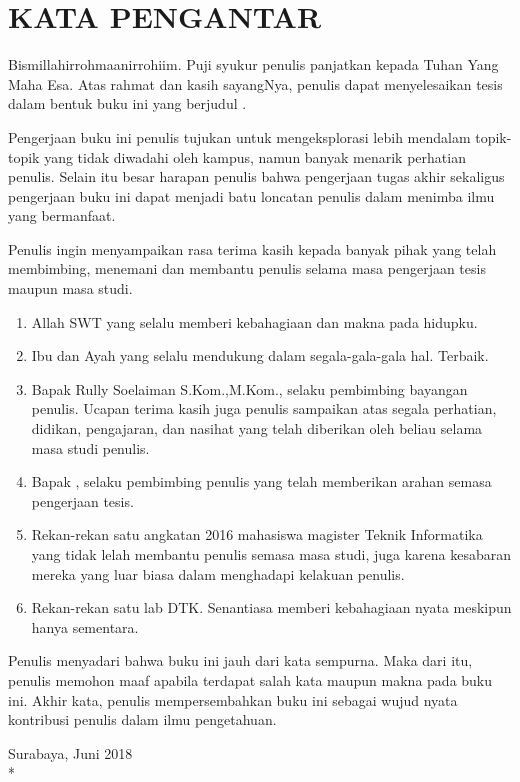 \chapter {KATA PENGANTAR}

Bismillahirrohmaanirrohiim. Puji syukur penulis panjatkan kepada Tuhan Yang Maha Esa. Atas rahmat dan kasih sayangNya, penulis dapat menyelesaikan tesis dalam bentuk buku ini yang berjudul \textbf{\judul}.

Pengerjaan buku ini penulis tujukan untuk mengeksplorasi lebih mendalam topik-topik yang tidak diwadahi oleh kampus, namun banyak menarik perhatian penulis. Selain itu besar harapan penulis bahwa pengerjaan tugas akhir sekaligus pengerjaan buku ini dapat menjadi batu loncatan penulis dalam menimba ilmu yang bermanfaat.

Penulis ingin menyampaikan rasa terima kasih kepada banyak pihak yang telah membimbing, menemani dan membantu penulis selama masa pengerjaan tesis maupun masa studi.

\begin {enumerate}
	\item Allah SWT yang selalu memberi kebahagiaan dan makna pada hidupku.
  \item Ibu dan Ayah yang selalu mendukung dalam segala-gala-gala hal. Terbaik.
  \item Bapak Rully Soelaiman S.Kom.,M.Kom., selaku pembimbing bayangan penulis. Ucapan terima kasih juga penulis sampaikan atas segala perhatian, didikan, pengajaran, dan nasihat yang telah diberikan oleh beliau selama masa studi penulis.
  \item Bapak \pembimbingsatu, selaku pembimbing penulis yang telah memberikan arahan semasa pengerjaan tesis.
  \item Rekan-rekan satu angkatan 2016 mahasiswa magister Teknik Informatika yang tidak lelah membantu penulis semasa masa studi, juga karena kesabaran mereka yang luar biasa dalam menghadapi kelakuan penulis.
  \item Rekan-rekan satu lab DTK. Senantiasa memberi kebahagiaan nyata meskipun hanya sementara.
\end {enumerate}

Penulis menyadari bahwa buku ini jauh dari kata sempurna. Maka dari itu, penulis memohon maaf apabila terdapat salah kata maupun makna pada buku ini. Akhir kata, penulis mempersembahkan buku ini sebagai wujud nyata kontribusi penulis dalam ilmu pengetahuan.

\begin{flushright}
Surabaya, Juni 2018 \\*
\vspace{5em}
\penulis
\end{flushright}